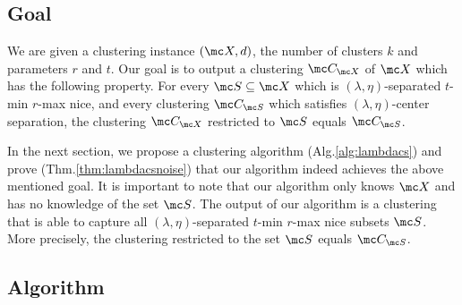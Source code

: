 \documentclass[11pt]{article}
\begin{document}

\subsection{Goal}
We are given a clustering instance $(\mc X, d)$, the number of clusters $k$ and parameters $r$ and $t$. Our goal is to output a clustering $\mc C_{\mc X}$ of $\mc X$ which has the following property. For every $\mc S \subseteq \mc X$ which is $(\lambda, \eta)$-separated $t$-min $r$-max nice, and every clustering $\mc C_{\mc S}$ which satisfies $(\lambda, \eta)$-center separation, the clustering $\mc C_{\mc X}$ restricted to $\mc S$ equals $\mc C_{\mc S}$. 

In the next section, we propose a clustering algorithm (Alg.\ref{alg:lambdacs}) and prove (Thm.\ref{thm:lambdacsnoise}) that our algorithm indeed achieves the above mentioned goal. It is important to note that our algorithm only knows $\mc X$ and has no knowledge of the set $\mc S$. The output of our algorithm is a clustering that is able to capture all $(\lambda, \eta)$-separated $t$-min $r$-max nice subsets $\mc S$. More precisely, the clustering restricted to the set $\mc S$ equals $\mc C_{\mc S}$.

\subsection{Algorithm}
\end{document}
